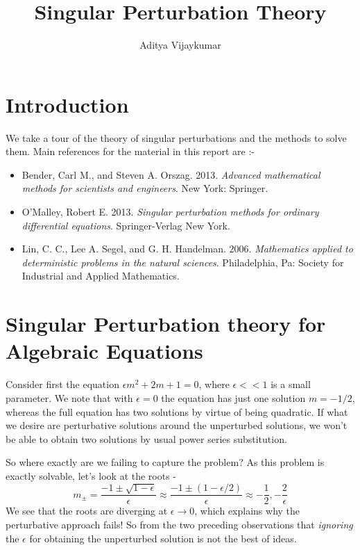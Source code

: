\documentclass[a4paper,11pt]{article}
\title{\textbf{Singular Perturbation Theory}}
\author{Aditya Vijaykumar}
\affiliation{International Centre for Theoretical Sciences, Bengaluru, India.}
\begin{document}
\maketitle
\section{Introduction}
We take a tour of the theory of singular perturbations and the methods to solve them. Main references for the material in this report are :-
\begin{itemize}
\item Bender, Carl M., and Steven A. Orszag. 2013. \textit{Advanced mathematical methods for scientists and engineers}. New York: Springer.
\item O'Malley, Robert E. 2013. \textit{Singular perturbation methods for ordinary differential equations}.  Springer-Verlag New York.
\item Lin, C. C., Lee A. Segel, and G. H. Handelman. 2006. \textit{Mathematics applied to deterministic problems in the natural sciences}. Philadelphia, Pa: Society for Industrial and Applied Mathematics.
\end{itemize}
\section{Singular Perturbation theory for Algebraic Equations}
Consider first the equation $ \epsilon m^2 + 2m + 1 =0 $, where $ \epsilon << 1 $ is a small parameter. We note that with $ \epsilon= 0$ the equation has just one solution $ m = -1/2 $, whereas the full equation has two solutions by virtue of being quadratic. If what we desire are perturbative solutions around the unperturbed solutions, we won't be able to obtain two solutions by usual power series substitution.

So where exactly are we failing to capture the problem? As this problem is exactly solvable, let's look at the roots -
\begin{equation*}
m_\pm = \dfrac{-1 \pm \sqrt{1 - \epsilon}}{\epsilon} \approx\dfrac{-1 \pm (1 - \epsilon/2)}{\epsilon} \approx -\dfrac{1}{2}, - \dfrac{2}{\epsilon}
\end{equation*}
We see that the roots are diverging at $ \epsilon \rightarrow 0 $, which explains why the perturbative approach fails! So  from the two preceding observations that \textit{ignoring} the $ \epsilon $ for obtaining the unperturbed solution is not the best of ideas. 
\end{document}

